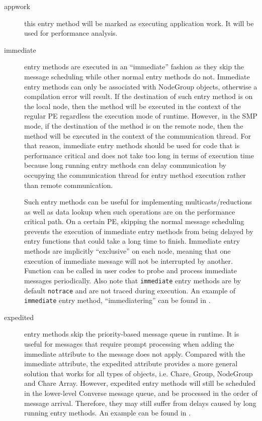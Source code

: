 \begin{description}
\item[appwork] this entry method will be marked as executing application work. It will be used for performance analysis.

\item[immediate] entry methods are executed in an
``immediate'' fashion as they skip the message scheduling while other normal
entry methods do not. Immediate entry methods can only be associated with
NodeGroup objects, otherwise a compilation error will result. If the
destination of such entry method is on the local node, then the method will be
executed in the context of the regular PE regardless the execution mode of
\charmpp{} runtime. However, in the SMP mode, if the destination of the method
is on the remote node, then the method will be executed in the context of the
communication thread. For that reason, immediate entry methods should be used
for code that is performance critical and does not take too long in terms of
execution time because long running entry methods can delay communication by
occupying the communication thread for entry method execution rather than
remote communication.

Such entry methods can be useful for implementing multicasts/reductions as well
as data lookup when such operations are on the performance critical path. On a
certain \charmpp{} PE, skipping the normal message scheduling prevents the
execution of immediate entry methods from being delayed by entry functions that
could take a long time to finish. Immediate entry methods are implicitly
``exclusive'' on each node, meaning that one execution of immediate message
will not be interrupted by another. Function  can be
called in user codes to probe and process immediate messages periodically. Also
note that \texttt{immediate} entry methods are by default \texttt{notrace} and are
not traced during execution. An example of \texttt{immediate} entry method,
``immediatering'' can be found in .

\item[expedited] entry methods skip the priority-based message
queue in \charmpp{} runtime. It is useful for messages that require prompt
processing when adding the immediate attribute to the message does not apply.
Compared with the immediate attribute, the expedited attribute provides a more
general solution that works for all types of \charmpp{} objects, i.e. Chare,
Group, NodeGroup and Chare Array. However, expedited entry methods will still
be scheduled in the lower-level Converse message queue, and be processed in the
order of message arrival. Therefore, they may still suffer from delays caused
by long running entry methods. An example can be found in 
.


\end{description}
